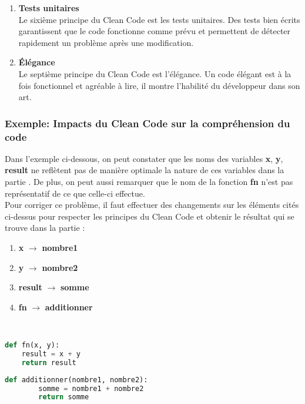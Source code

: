 \documentclass{rapport}
\begin{document}
\begin{enumerate}[listparindent=0pt, parsep=0pt]
    \item \textbf{Tests unitaires}\\
    Le sixième principe du Clean Code est les tests unitaires. Des tests bien écrits garantissent que le code fonctionne comme prévu et permettent de détecter rapidement un problème après une modification.\\

    \item \textbf{Élégance} \\
    Le septième principe du Clean Code est l'élégance. Un code élégant est à la fois fonctionnel et agréable à lire, il montre l'habilité du développeur dans son art.\\
\end{enumerate}

\subsubsection{Exemple: Impacts du Clean Code sur la compréhension du code}
Dans l'exemple ci-dessous, on peut constater que les noms des variables \textbf{x}, \textbf{y}, \textbf{result} ne reflètent pas de manière optimale la nature de ces variables dans la partie . De plus, on peut aussi remarquer que le nom de la fonction \textbf{fn} n'est pas représentatif de ce que celle-ci effectue.\\

Pour corriger ce problème, il faut effectuer des changements sur les éléments cités ci-dessus pour respecter les principes du Clean Code et obtenir le résultat qui se trouve dans la partie :  
\begin{enumerate}
    \item \textbf{x} $\rightarrow$ \textbf{nombre1}
    \item \textbf{y} $\rightarrow$ \textbf{nombre2}
    \item \textbf{result} $\rightarrow$ \textbf{somme}
    \item \textbf{fn} $\rightarrow$ \textbf{additionner}
\end{enumerate} \\
\begin{minipage}[t]{0.48\linewidth}
    \label{lstlisting:WithoutCleanCode}
    \label{lstlisting:WithCleanCode}
    \begin{lstlisting}[language=python, style = code_style_no_border]
    def fn(x, y):
    result = x + y
    return result
    \end{lstlisting}
\end{minipage}
\hfill\vrule\hfill
\begin{minipage}[t]{0.51\linewidth}
    \begin{lstlisting}[language=python, style = code_style_no_border]
    def additionner(nombre1, nombre2):
        somme = nombre1 + nombre2
        return somme
    \end{lstlisting}
\end{minipage}
\end{document}
